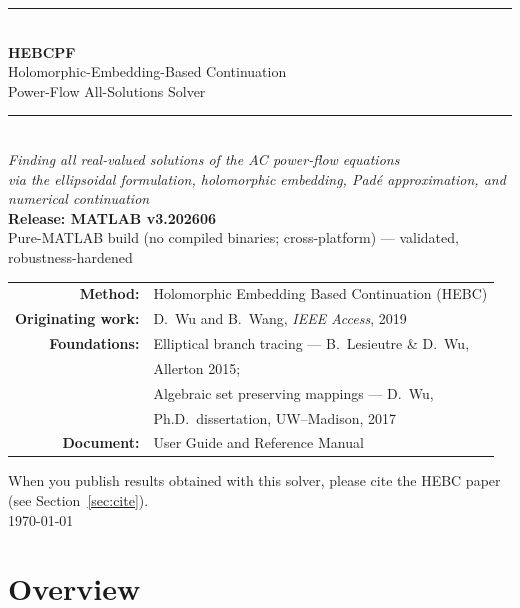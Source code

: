 \documentclass[11pt,a4paper]{article}
\begin{document}
\begin{titlepage}
\centering
\vspace*{2.2cm}
{\color{rule}\rule{\textwidth}{1.2pt}}\\[8pt]
{\Huge\bfseries HEBCPF}\\[10pt]
{\LARGE Holomorphic-Embedding-Based Continuation}\\[4pt]
{\LARGE Power-Flow All-Solutions Solver}\\[10pt]
{\color{rule}\rule{\textwidth}{1.2pt}}\\[18pt]
{\large\itshape Finding \emph{all} real-valued solutions of the AC power-flow equations}\\[6pt]
{\large\itshape via the ellipsoidal formulation, holomorphic embedding, Pad\'e approximation, and numerical continuation}\\[26pt]

{\large\bfseries Release: MATLAB v3.202606}\\[4pt]
{\large Pure-MATLAB build (no compiled binaries; cross-platform) --- validated, robustness-hardened}\\[30pt]

\begin{tabular}{rl}
\textbf{Method:} & Holomorphic Embedding Based Continuation (HEBC)\\[3pt]
\textbf{Originating work:} & D.\ Wu and B.\ Wang, \emph{IEEE Access}, 2019\\[6pt]
\textbf{Foundations:} & Elliptical branch tracing --- B.\ Lesieutre \& D.\ Wu,\\[1pt]
                      & Allerton 2015;\\[3pt]
                      & Algebraic set preserving mappings --- D.\ Wu,\\[1pt]
                      & Ph.D.\ dissertation, UW--Madison, 2017\\[6pt]
\textbf{Document:} & User Guide and Reference Manual\\
\end{tabular}

\vfill
{\small When you publish results obtained with this solver, please cite the HEBC
paper (see Section~\ref{sec:cite}).}\\[6pt]
{\small\today}
\end{titlepage}

\tableofcontents
\newpage

\section{Overview}
\end{document}
